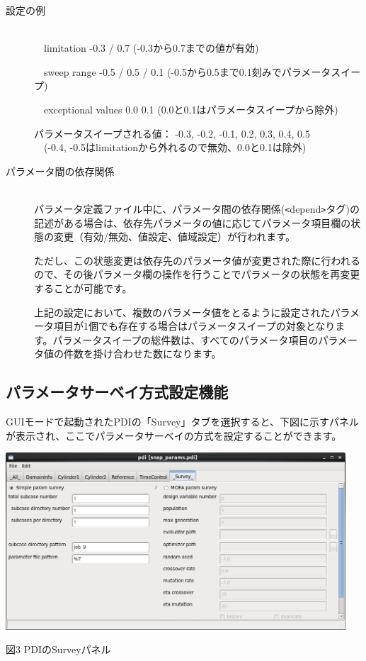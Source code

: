 \documentclass[a4paper,11pt]{jarticle}
\begin{document}
\begin{description}
\item[設定の例] \begin{tt}{\ }\\
　limitation -0.3 / 0.7 (-0.3から0.7までの値が有効)

　sweep range -0.5 / 0.5 / 0.1 (-0.5から0.5まで0.1刻みでパラメータスイープ)

　exceptional values 0.0 0.1 (0.0と0.1はパラメータスイープから除外)

パラメータスイープされる値： -0.3, -0.2, -0.1,   0.2,  0.3,  0.4,  0.5\\
　(-0.4, -0.5はlimitationから外れるので無効、0.0と0.1は除外)
\end{tt}

\item[パラメータ間の依存関係]{\ }\\
パラメータ定義ファイル中に、パラメータ間の依存関係(\texttt{<}depend\texttt{>}タグ)の記述がある場合は、依存先パラメータの値に応じてパラメータ項目欄の状態の変更（有効/無効、値設定、値域設定）が行われます。

ただし、この状態変更は依存先のパラメータ値が変更された際に行われるので、その後パラメータ欄の操作を行うことでパラメータの状態を再変更することが可能です。

上記の設定において、複数のパラメータ値をとるように設定されたパラメータ項目が1個でも存在する場合はパラメータスイープの対象となります。パラメータスイープの総件数は、すべてのパラメータ項目のパラメータ値の件数を掛け合わせた数になります。
\end{description}


\subsection{パラメータサーベイ方式設定機能}

GUIモードで起動されたPDIの「Survey」タブを選択すると、下図に示すパネルが表示され、ここでパラメータサーベイの方式を設定することができます。

\begin{center}
\includegraphics[width=360pt, bb=0 0 984 511]{figs/fig002.png}

図3 PDIのSurveyパネル
\end{center}
\end{document}
